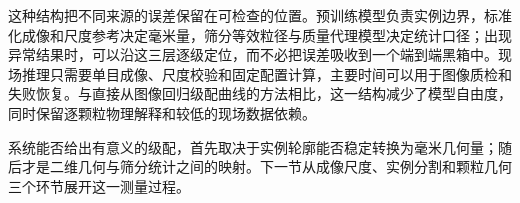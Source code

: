 这种结构把不同来源的误差保留在可检查的位置。预训练模型负责实例边界，标准化成像和尺度参考决定毫米量，筛分等效粒径与质量代理模型决定统计口径；出现异常结果时，可以沿这三层逐级定位，而不必把误差吸收到一个端到端黑箱中。现场推理只需要单目成像、尺度校验和固定配置计算，主要时间可以用于图像质检和失败恢复。与直接从图像回归级配曲线的方法相比\cite{coenen2022learningToSieve,buscombe2020sedinet}，这一结构减少了模型自由度，同时保留逐颗粒物理解释和较低的现场数据依赖。

系统能否给出有意义的级配，首先取决于实例轮廓能否稳定转换为毫米几何量；随后才是二维几何与筛分统计之间的映射。下一节从成像尺度、实例分割和颗粒几何三个环节展开这一测量过程。
